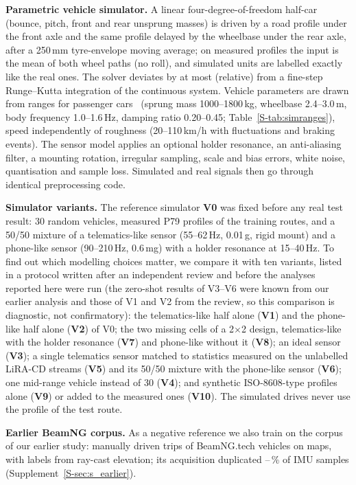 \textbf{Parametric vehicle simulator.}
A linear four-degree-of-freedom half-car (bounce, pitch, front and rear unsprung masses) is driven by a road profile under the front axle and the same profile delayed by the wheelbase under the rear axle, after a 250\,mm tyre-envelope moving average; on measured profiles the input is the mean of both wheel paths (no roll), and simulated units are labelled exactly like the real ones.
The solver deviates by at most \simRkDev{} (relative) from a fine-step Runge--Kutta integration of the continuous system.
Vehicle parameters are drawn from ranges for passenger cars~\cite{gillespie1992} (sprung mass 1000--1800\,kg, wheelbase 2.4--3.0\,m, body frequency 1.0--1.6\,Hz, damping ratio 0.20--0.45; Table~\ref{S-tab:simranges}), speed independently of roughness (20--110\,km/h with fluctuations and braking events).
The sensor model applies an optional holder resonance, an anti-aliasing filter, a mounting rotation, irregular sampling, scale and bias errors, white noise, quantisation and sample loss.
Simulated and real signals then go through identical preprocessing code.

\textbf{Simulator variants.}
The reference simulator \textbf{V0} was fixed before any real test result: 30 random vehicles, measured P79 profiles of the training routes, and a 50/50 mixture of a telematics-like sensor (55--62\,Hz, 0.01\,g, rigid mount) and a phone-like sensor (90--210\,Hz, 0.6\,mg) with a holder resonance at 15--40\,Hz.
To find out which modelling choices matter, we compare it with ten variants, listed in a protocol written after an independent review and before the analyses reported here were run (the zero-shot results of V3--V6 were known from our earlier analysis and those of V1 and V2 from the review, so this comparison is diagnostic, not confirmatory): the telematics-like half alone (\textbf{V1}) and the phone-like half alone (\textbf{V2}) of V0; the two missing cells of a 2$\times$2 design, telematics-like with the holder resonance (\textbf{V7}) and phone-like without it (\textbf{V8}); an ideal sensor (\textbf{V3}); a single telematics sensor matched to statistics measured on the unlabelled LiRA-CD streams (\textbf{V5}) and its 50/50 mixture with the phone-like sensor (\textbf{V6}); one mid-range vehicle instead of 30 (\textbf{V4}); and synthetic ISO-8608-type profiles~\cite{iso8608} alone (\textbf{V9}) or added to the measured ones (\textbf{V10}).
The simulated drives never use the profile of the test route.

\textbf{Earlier BeamNG corpus.}
As a negative reference we also train on the corpus of our earlier study: \bngTrips{} manually driven trips of \bngCars{} BeamNG.tech vehicles on \bngMaps{} maps, with labels from ray-cast elevation; its acquisition duplicated \bngImuDupMin--\bngImuDupMax\,\% of IMU samples (Supplement~\ref{S-sec:s_earlier}).
